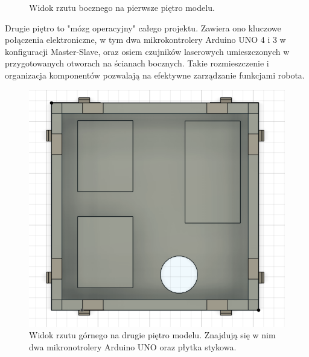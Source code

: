\documentclass{report}
\begin{document}
\begin{figure}[htbp]
\begin{minipage}[b]{0.45\textwidth}
        \caption{Widok rzutu bocznego na pierwsze piętro modelu.}
        \label{fig:zdjecie2}
    \end{minipage}
\end{figure}

Drugie piętro to "mózg operacyjny" całego projektu. Zawiera ono kluczowe połączenia elektroniczne, w tym dwa mikrokontrolery Arduino UNO 4 i 3 w konfiguracji Master-Slave, oraz osiem czujników laserowych umieszczonych w przygotowanych otworach na ścianach bocznych. 
Takie rozmieszczenie i organizacja komponentów pozwalają na efektywne zarządzanie funkcjami robota.

\begin{figure}[htbp]
    \centering
    \begin{minipage}[b]{0.45\textwidth}
        \centering
        \includegraphics[width=\textwidth]{"src/Robot_pics/Gora.png"}
        \caption{Widok rzutu górnego na drugie piętro modelu. Znajdują się w nim dwa mikronotrolery Arduino UNO oraz płytka stykowa.}
        \label{fig:zdjecie1}
    \end{minipage}
    \hfill
    \begin{minipage}[b]{0.45\textwidth}
        \centering

\end{minipage}
\end{figure}
\end{document}

